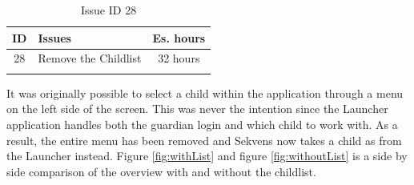 \begin{longtable} { | c | p{12cm} | c | } 
\hline
	ID 	&	Issues	&		 Es. hours \\\hline
	28 	&	Remove the Childlist	&	32 hours \\\hline
\caption{Issue ID 28}
\label{tab:spr2_removechildlist}
\end{longtable}

It was originally possible to select a child within the application through a menu on the left side of the screen. This was never the intention since the Launcher application handles both the guardian login and which child to work with. As a result, the entire menu has been removed and Sekvens now takes a child as  from the Launcher instead. Figure \ref{fig:withList} and figure \ref{fig:withoutList} is a side by side comparison of the overview with and without the childlist. 

